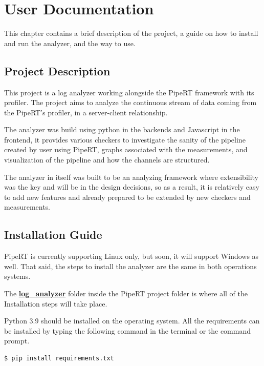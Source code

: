 \chapter{User Documentation} %
\label{ch:user}

This chapter contains a brief description of the project, a guide on how
to install and run the analyzer, and the way to use.

\section{Project Description} %
This project is a log analyzer working alongside the PipeRT framework
with its profiler. The project aims to analyze the continuous stream of
data coming from the PipeRT's profiler, in a server-client relationship.

The analyzer was build using python in the backends and Javascript in the frontend,
it provides various checkers to investigate the sanity of the pipeline created by
user using PipeRT, graphs associated with the measurements, and visualization
of the pipeline and how the channels are structured.

The analyzer in itself was built to be an analyzing framework where
extensibility was the key and will be in the design decisions, so as a result,
it is relatively easy to add new features and already prepared to be extended
by new checkers and measurements.


\section{Installation Guide}\label{sec:installiation_guide}
PipeRT is currently supporting Linux only, but soon,
it will support Windows as well. That said, the steps to install
the analyzer are the same in both operations systems.

The \textbf{\url{log_analyzer}} folder inside the PipeRT project folder
is where all of the Installation steps will take place.

Python 3.9 should be installed on the operating system. All the
requirements can be installed by typing the following command in
the terminal or the command prompt.
\newline
\begin{lstlisting}[language=bash, caption={Install requirements},captionpos=b]
	$ pip install requirements.txt
\end{lstlisting}

